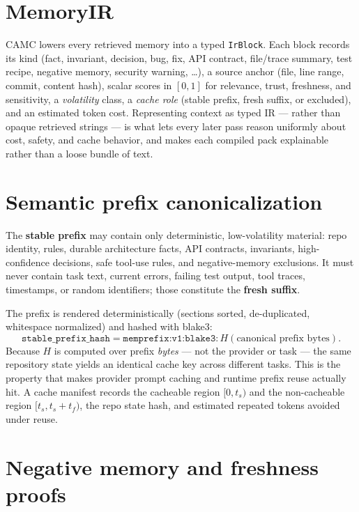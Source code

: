 \documentclass[11pt]{article}
\begin{document}
\section{MemoryIR}
\label{sec:ir}

CAMC lowers every retrieved memory into a typed \texttt{IrBlock}. Each block
records its kind (fact, invariant, decision, bug, fix, API contract, file/trace
summary, test recipe, negative memory, security warning, \ldots), a source anchor
(file, line range, commit, content hash), scalar scores in $[0,1]$ for relevance,
trust, freshness, and sensitivity, a \emph{volatility} class, a \emph{cache role}
(stable prefix, fresh suffix, or excluded), and an estimated token cost.
Representing context as typed IR --- rather than opaque retrieved strings --- is
what lets every later pass reason uniformly about cost, safety, and cache behavior,
and makes each compiled pack explainable rather than a loose bundle of text.

\section{Semantic prefix canonicalization}
\label{sec:prefix}

The \textbf{stable prefix} may contain only deterministic, low-volatility material:
repo identity, rules, durable architecture facts, API contracts, invariants,
high-confidence decisions, safe tool-use rules, and negative-memory exclusions. It
must never contain task text, current errors, failing test output, tool traces,
timestamps, or random identifiers; those constitute the \textbf{fresh suffix}.

The prefix is rendered deterministically (sections sorted, de-duplicated, whitespace
normalized) and hashed with blake3:
\[
\texttt{stable\_prefix\_hash} = \texttt{memprefix:v1:blake3:}\,H(\text{canonical prefix bytes}).
\]
Because $H$ is computed over prefix \emph{bytes} --- not the provider or task ---
the same repository state yields an identical cache key across different tasks. This
is the property that makes provider prompt caching and runtime prefix reuse actually
hit. A cache manifest records the cacheable region $[0, t_s)$ and the
non-cacheable region $[t_s, t_s + t_f)$, the repo state hash, and estimated repeated
tokens avoided under reuse.

\section{Negative memory and freshness proofs}
\label{sec:safety}
\end{document}
